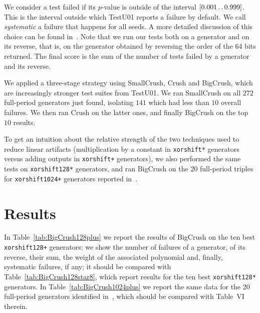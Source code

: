 \documentclass{acmsmalltr}
\def\..{\,\mathpunct{\ldotp\ldotp}}
\newcommand{\xorshifts}[1][]{\texttt{xorshift#1*}\xspace}
\newcommand{\xorshiftp}[1][]{\texttt{xorshift#1+}\xspace}
\begin{document}
We consider a test failed if its $p$-value is outside of the interval
$[0.001\..0.999]$. This is the interval outside which TestU01 reports a failure by default. 
We call \emph{systematic} a failure
that happens for all seeds. A more detailed discussion of this choice can be found in~\cite{VigEEMXGS}.
Note that we run our tests both on a generator and on its
reverse, that is, on the generator obtained by reversing the
order of the 64 bits returned. The final score is the sum of the number of tests
failed by a generator and its reverse.

We applied a three-stage strategy using SmallCrush, Crush and BigCrush,
which are increasingly stronger test suites from TestU01. We ran SmallCrush on
all $272$ full-period generators just found, isolating $141$ which had less than
$10$ overall failures. We then ran Crush on the latter ones, and finally
BigCrush on the top $10$ results. 

To get an intuition about the relative strength of the two techniques used to
reduce linear artifacts (multiplication by a constant in \xorshifts generators
versus adding outputs in \xorshiftp generators), we also performed the same
tests on \xorshifts[128] generators, and ran BigCrush on the $20$ full-period
triples for \xorshiftp[1024] generators reported in~\cite{VigEEMXGS}.

\section{Results}







In
Table~\ref{tab:BigCrush128plus} we report the results of BigCrush on the ten
best \xorshiftp[128] generators: we show the number of failures of a generator,
of its reverse, their sum, the weight of the associated polynomial and, finally,
systematic failures, if any; it should be compared with
Table~\ref{tab:BigCrush128star8}, which report results for the ten best \xorshifts[128] generators.
In Table~\ref{tab:BigCrush1024plus} we report the same data for the 20
full-period generators identified in~\cite{VigEEMXGS}, which should
be compared with Table~VI therein.
\end{document}
